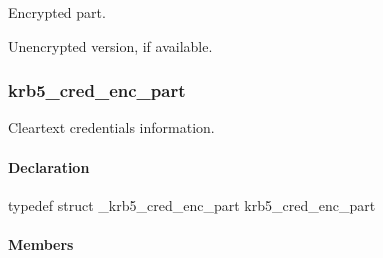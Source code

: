 \documentclass[letterpaper,10pt,english]{sphinxmanual}
\begin{document}

\begin{fulllineitems}
\label{appdev/refs/types/krb5_cred:c.krb5_cred.enc_part}
Encrypted part.

\end{fulllineitems}


\begin{fulllineitems}
\label{appdev/refs/types/krb5_cred:c.krb5_cred.enc_part2}
Unencrypted version, if available.

\end{fulllineitems}



\subsubsection{krb5\_cred\_enc\_part}
\label{appdev/refs/types/krb5_cred_enc_part::doc}\label{appdev/refs/types/krb5_cred_enc_part:krb5-cred-enc-part}\label{appdev/refs/types/krb5_cred_enc_part:krb5-cred-enc-part-struct}

\begin{fulllineitems}
\label{appdev/refs/types/krb5_cred_enc_part:c.krb5_cred_enc_part}
\end{fulllineitems}


Cleartext credentials information.


\paragraph{Declaration}
\label{appdev/refs/types/krb5_cred_enc_part:declaration}
typedef struct \_krb5\_cred\_enc\_part  krb5\_cred\_enc\_part


\paragraph{Members}
\label{appdev/refs/types/krb5_cred_enc_part:members}

\begin{fulllineitems}
\label{appdev/refs/types/krb5_cred_enc_part:c.krb5_cred_enc_part.magic}
\end{fulllineitems}
\end{document}
